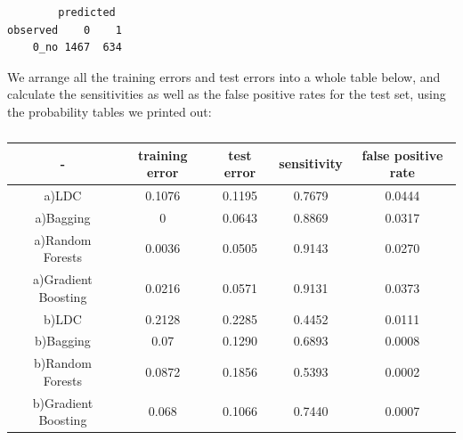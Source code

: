 \documentclass[
  11pt,
]{article}
\newenvironment{Shaded}{\begin{snugshade}}{\end{snugshade}}
\newcommand{\AttributeTok}[1]{\textcolor[rgb]{0.77,0.63,0.00}{#1}}
\newcommand{\DecValTok}[1]{\textcolor[rgb]{0.00,0.00,0.81}{#1}}
\newcommand{\FunctionTok}[1]{\textcolor[rgb]{0.00,0.00,0.00}{#1}}
\newcommand{\NormalTok}[1]{#1}
\newcommand{\OtherTok}[1]{\textcolor[rgb]{0.56,0.35,0.01}{#1}}
\newcommand{\SpecialCharTok}[1]{\textcolor[rgb]{0.00,0.00,0.00}{#1}}
\newcommand{\StringTok}[1]{\textcolor[rgb]{0.31,0.60,0.02}{#1}}
\begin{document}
\begin{Shaded}
\end{Shaded}

\begin{verbatim}
        predicted
observed    0    1
    0_no 1467  634
\end{verbatim}

We arrange all the training errors and test errors into a whole table below, and calculate the sensitivities as well as the false positive rates for the test set, using the probability tables we printed out:

\begin{table}[h!]
  \begin{center}
    \caption{}
    \label{tab:}
    \begin{tabular}{c|c|c|c|c}
      \textbf{ - } & \textbf{training error} & \textbf{test error} & \textbf{sensitivity} & \textbf{false positive rate}\\
      \hline
        a)LDC&0.1076&0.1195&0.7679&0.0444\\
        a)Bagging&0&0.0643&0.8869&0.0317\\
        a)Random Forests&0.0036&0.0505&0.9143&0.0270\\
        a)Gradient Boosting&0.0216&0.0571&0.9131&0.0373\\
        b)LDC&0.2128&0.2285&0.4452&0.0111\\
        b)Bagging&0.07&0.1290&0.6893&0.0008\\
        b)Random Forests&0.0872&0.1856&0.5393&0.0002\\
        b)Gradient Boosting&0.068&0.1066&0.7440&0.0007\\
    \end{tabular}
  \end{center}
\end{table}
\end{document}
